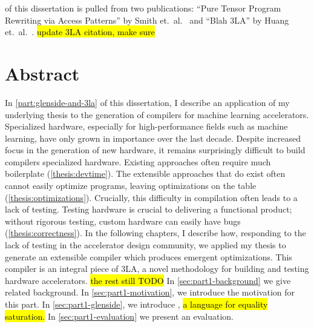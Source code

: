   of this dissertation
  is pulled from two publications:
``Pure Tensor Program Rewriting via Access Patterns'' by Smith et.~al.~\cite{smith2021pure} and ``Blah 3LA'' by Huang et.~al.~\cite{huang2022specialized}. \hl{update 3LA citation, make sure}

\chapter*{ Abstract}

In \cref{part:glenside-and-3la} of this dissertation,
  I describe an application of my underlying thesis
  to the generation of compilers
  for machine learning accelerators.
Specialized hardware, especially for high-performance fields
  such as machine learning,
  have only grown in importance
  over the last decade.
Despite increased focus
  in the generation of new hardware,
  it remains surprisingly difficult
  to build compilers specialized hardware.
Existing approaches
  often require much boilerplate (\cref{thesis:devtime}).
The extensible approaches that do exist
  often cannot easily optimize programs,
  leaving optimizations on the table (\cref{thesis:optimizations}).
Crucially, this difficulty in compilation
  often leads to a lack of testing.
Testing hardware is crucial
  to delivering a functional product;
  without rigorous testing,
  custom hardware can easily have bugs
  (\cref{thesis:correctness}).
In the following chapters,
  I describe how,
  responding to the lack of testing
  in the accelerator design
  community,
  we applied
  my thesis
  to generate an extensible
  compiler
  which produces emergent optimizations.
This compiler is an integral piece of 3LA,
  a novel methodology
  for building and testing hardware accelerators.
\hl{the rest still TODO}
In \cref{sec:part1-background}
  we give related background.
In \cref{sec:part1-motivation},
  we introduce the
  motivation for this part.
In \cref{sec:part1-glenside},
  we introduce \g,
  \hl{a language for equality saturation.}
In \cref{sec:part1-evaluation}
  we present an evaluation.

